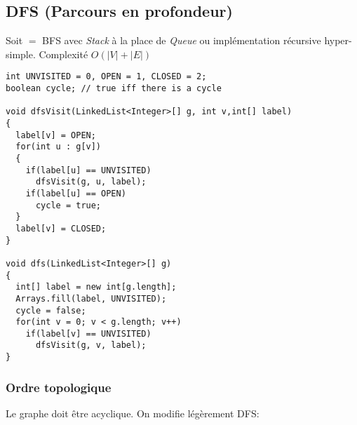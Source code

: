 \subsection{DFS (Parcours en profondeur)}
Soit $=$ BFS avec \textit{Stack} à la place de \textit{Queue} ou implémentation récursive hyper-simple. Complexité $O(|V|+|E|)$\\

\begin{lstlisting}
int UNVISITED = 0, OPEN = 1, CLOSED = 2;
boolean cycle; // true iff there is a cycle

void dfsVisit(LinkedList<Integer>[] g, int v,int[] label)
{
  label[v] = OPEN;
  for(int u : g[v])
  {
    if(label[u] == UNVISITED)
      dfsVisit(g, u, label);	
    if(label[u] == OPEN)
      cycle = true;
  }
  label[v] = CLOSED;
}

void dfs(LinkedList<Integer>[] g)
{
  int[] label = new int[g.length];
  Arrays.fill(label, UNVISITED);
  cycle = false;
  for(int v = 0; v < g.length; v++)
    if(label[v] == UNVISITED)
      dfsVisit(g, v, label);
}
\end{lstlisting}
\subsubsection{Ordre topologique}
\begin{center}
\end{center}
Le graphe doit être acyclique. On modifie légèrement DFS:\\

